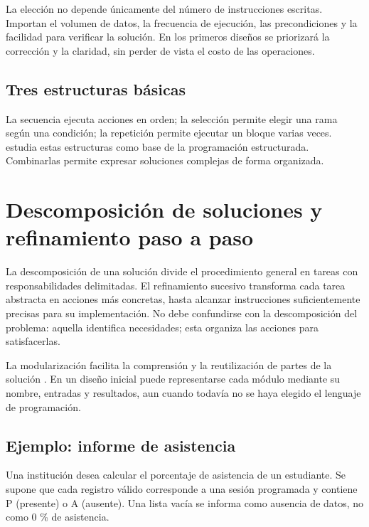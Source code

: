 La elección no depende únicamente del número de instrucciones escritas. Importan el volumen de datos, la frecuencia de ejecución, las precondiciones y la facilidad para verificar la solución. En los primeros diseños se priorizará la corrección y la claridad, sin perder de vista el costo de las operaciones.

\subsection{Tres estructuras básicas}

La secuencia ejecuta acciones en orden; la selección permite elegir una rama según una condición; la repetición permite ejecutar un bloque varias veces. \textcite[pp.~86–95]{farrell2013} estudia estas estructuras como base de la programación estructurada. Combinarlas permite expresar soluciones complejas de forma organizada.

\section{Descomposición de soluciones y refinamiento paso a paso}

La descomposición de una solución divide el procedimiento general en tareas con responsabilidades delimitadas. El refinamiento sucesivo transforma cada tarea abstracta en acciones más concretas, hasta alcanzar instrucciones suficientemente precisas para su implementación. No debe confundirse con la descomposición del problema: aquella identifica necesidades; esta organiza las acciones para satisfacerlas.

La modularización facilita la comprensión y la reutilización de partes de la solución \parencite[pp.~48–51]{farrell2013}. En un diseño inicial puede representarse cada módulo mediante su nombre, entradas y resultados, aun cuando todavía no se haya elegido el lenguaje de programación.

\subsection{Ejemplo: informe de asistencia}

Una institución desea calcular el porcentaje de asistencia de un estudiante. Se supone que cada registro válido corresponde a una sesión programada y contiene P (presente) o A (ausente). Una lista vacía se informa como ausencia de datos, no como 0 \% de asistencia.



